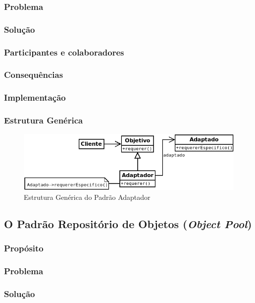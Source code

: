 \subsubsection{Problema}
\subsubsection{Solução}
\subsubsection{Participantes e colaboradores}
\subsubsection{Consequências}
\subsubsection{Implementação}
\subsubsection{Estrutura Genérica}

\begin{figure}[h]
\begin{center}
\includegraphics[scale=0.6]{adaptador.png}
\caption{Estrutura Genérica do Padrão Adaptador}\label{fig:adaptador}
\end{center}
\end{figure}

\subsection{O Padrão Repositório de Objetos (\textit{Object Pool})}
\subsubsection{Propósito}
\subsubsection{Problema}
\subsubsection{Solução}
